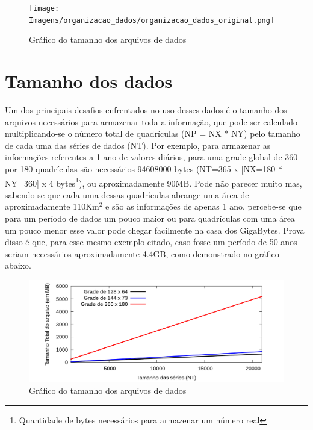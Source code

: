 \begin{figure}[H]
\centering
\texttt{[image: Imagens/organizacao\_dados/organizacao\_dados\_original.png]}
\caption{Gráfico do tamanho dos arquivos de dados}
\label{fig:organizacao_dados_original}
\end{figure}

\section{Tamanho dos dados}

Um dos principais desafios enfrentados no uso desses dados é o tamanho dos arquivos necessários para armazenar toda a informação, que pode ser calculado multiplicando-se o número total de quadrículas (NP = NX * NY) pelo tamanho de cada uma das séries de dados (NT). Por exemplo, para armazenar as informações referentes a 1 ano de valores diários, para uma grade global de 360 por 180 quadrículas são necessários 94608000 bytes (NT=365 x [NX=180 * NY=360] x 4 bytes\footnote{Quantidade de bytes necessários para armazenar um número real}), ou aproximadamente 90MB. Pode não parecer muito mas, sabendo-se que cada uma dessas quadrículas abrange uma área de aproximadamente 110Km$^2$ e são as informações de apenas 1 ano, percebe-se que para um período de dados um pouco maior ou para quadrículas com uma área um pouco menor esse valor pode chegar facilmente na casa dos GigaBytes. Prova disso é que, para esse mesmo exemplo citado, caso fosse um período de 50 anos seriam necessários aproximadamente 4.4GB, como demonstrado no gráfico abaixo.

\begin{figure}[H]
\centering
\includegraphics[width=1.0\textwidth]{Imagens/tamanho_dados/serie_tam_dados.png}
\caption{Gráfico do tamanho dos arquivos de dados}
\label{fig:grafico_tamanho_dados}
\end{figure}
